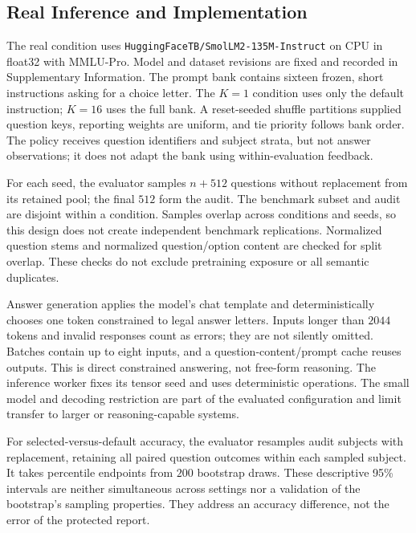 \documentclass{article}
\begin{document}
\subsection{Real Inference and Implementation}
The real condition uses \texttt{HuggingFaceTB/SmolLM2-135M-Instruct} on CPU in float32 with MMLU-Pro. Model and dataset revisions are fixed and recorded in Supplementary Information. The prompt bank contains sixteen frozen, short instructions asking for a choice letter. The $K=1$ condition uses only the default instruction; $K=16$ uses the full bank. A reset-seeded shuffle partitions supplied question keys, reporting weights are uniform, and tie priority follows bank order. The policy receives question identifiers and subject strata, but not answer observations; it does not adapt the bank using within-evaluation feedback.

For each seed, the evaluator samples $n+512$ questions without replacement from its retained pool; the final $512$ form the audit. The benchmark subset and audit are disjoint within a condition. Samples overlap across conditions and seeds, so this design does not create independent benchmark replications. Normalized question stems and normalized question/option content are checked for split overlap. These checks do not exclude pretraining exposure or all semantic duplicates.

Answer generation applies the model's chat template and deterministically chooses one token constrained to legal answer letters. Inputs longer than $2044$ tokens and invalid responses count as errors; they are not silently omitted. Batches contain up to eight inputs, and a question-content/prompt cache reuses outputs. This is direct constrained answering, not free-form reasoning. The inference worker fixes its tensor seed and uses deterministic operations. The small model and decoding restriction are part of the evaluated configuration and limit transfer to larger or reasoning-capable systems.

For selected-versus-default accuracy, the evaluator resamples audit subjects with replacement, retaining all paired question outcomes within each sampled subject. It takes percentile endpoints from $200$ bootstrap draws. These descriptive 95\% intervals are neither simultaneous across settings nor a validation of the bootstrap's sampling properties. They address an accuracy difference, not the error of the protected report.
\end{document}
